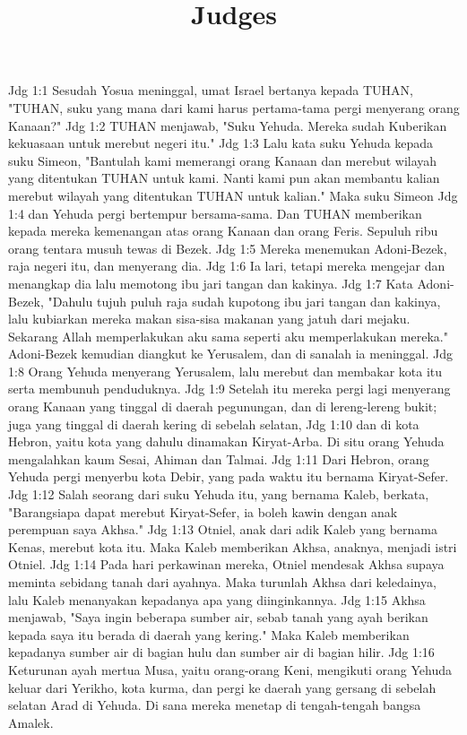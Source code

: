 

\title{Judges}

Jdg 1:1  Sesudah Yosua meninggal, umat Israel bertanya kepada TUHAN, "TUHAN, suku yang mana dari kami harus pertama-tama pergi menyerang orang Kanaan?"
Jdg 1:2  TUHAN menjawab, "Suku Yehuda. Mereka sudah Kuberikan kekuasaan untuk merebut negeri itu."
Jdg 1:3  Lalu kata suku Yehuda kepada suku Simeon, "Bantulah kami memerangi orang Kanaan dan merebut wilayah yang ditentukan TUHAN untuk kami. Nanti kami pun akan membantu kalian merebut wilayah yang ditentukan TUHAN untuk kalian." Maka suku Simeon
Jdg 1:4  dan Yehuda pergi bertempur bersama-sama. Dan TUHAN memberikan kepada mereka kemenangan atas orang Kanaan dan orang Feris. Sepuluh ribu orang tentara musuh tewas di Bezek.
Jdg 1:5  Mereka menemukan Adoni-Bezek, raja negeri itu, dan menyerang dia.
Jdg 1:6  Ia lari, tetapi mereka mengejar dan menangkap dia lalu memotong ibu jari tangan dan kakinya.
Jdg 1:7  Kata Adoni-Bezek, "Dahulu tujuh puluh raja sudah kupotong ibu jari tangan dan kakinya, lalu kubiarkan mereka makan sisa-sisa makanan yang jatuh dari mejaku. Sekarang Allah memperlakukan aku sama seperti aku memperlakukan mereka." Adoni-Bezek kemudian diangkut ke Yerusalem, dan di sanalah ia meninggal.
Jdg 1:8  Orang Yehuda menyerang Yerusalem, lalu merebut dan membakar kota itu serta membunuh penduduknya.
Jdg 1:9  Setelah itu mereka pergi lagi menyerang orang Kanaan yang tinggal di daerah pegunungan, dan di lereng-lereng bukit; juga yang tinggal di daerah kering di sebelah selatan,
Jdg 1:10  dan di kota Hebron, yaitu kota yang dahulu dinamakan Kiryat-Arba. Di situ orang Yehuda mengalahkan kaum Sesai, Ahiman dan Talmai.
Jdg 1:11  Dari Hebron, orang Yehuda pergi menyerbu kota Debir, yang pada waktu itu bernama Kiryat-Sefer.
Jdg 1:12  Salah seorang dari suku Yehuda itu, yang bernama Kaleb, berkata, "Barangsiapa dapat merebut Kiryat-Sefer, ia boleh kawin dengan anak perempuan saya Akhsa."
Jdg 1:13  Otniel, anak dari adik Kaleb yang bernama Kenas, merebut kota itu. Maka Kaleb memberikan Akhsa, anaknya, menjadi istri Otniel.
Jdg 1:14  Pada hari perkawinan mereka, Otniel mendesak Akhsa supaya meminta sebidang tanah dari ayahnya. Maka turunlah Akhsa dari keledainya, lalu Kaleb menanyakan kepadanya apa yang diinginkannya.
Jdg 1:15  Akhsa menjawab, "Saya ingin beberapa sumber air, sebab tanah yang ayah berikan kepada saya itu berada di daerah yang kering." Maka Kaleb memberikan kepadanya sumber air di bagian hulu dan sumber air di bagian hilir.
Jdg 1:16  Keturunan ayah mertua Musa, yaitu orang-orang Keni, mengikuti orang Yehuda keluar dari Yerikho, kota kurma, dan pergi ke daerah yang gersang di sebelah selatan Arad di Yehuda. Di sana mereka menetap di tengah-tengah bangsa Amalek.
